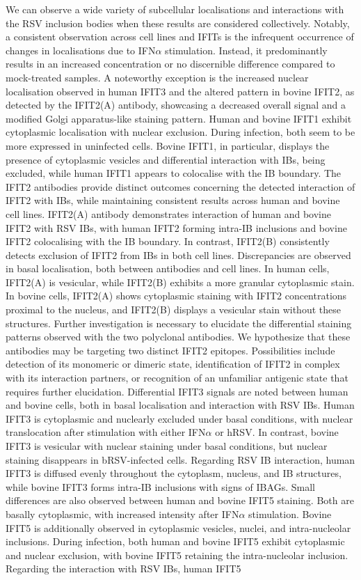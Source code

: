 We can observe a wide variety of subcellular localisations and interactions with the RSV inclusion bodies when these results are considered collectively. Notably, a consistent observation across cell lines and IFITs is the infrequent occurrence of changes in localisations due to IFN\(\alpha\) stimulation. Instead, it predominantly results in an increased concentration or no discernible difference compared to mock-treated samples. A noteworthy exception is the increased nuclear localisation observed in human IFIT3 and the altered pattern in bovine IFIT2, as detected by the IFIT2(A) antibody, showcasing a decreased overall signal and a modified Golgi apparatus-like staining pattern. Human and bovine IFIT1 exhibit cytoplasmic localisation with nuclear exclusion. During infection, both seem to be more expressed in uninfected cells. Bovine IFIT1, in particular, displays the presence of cytoplasmic vesicles and differential interaction with IBs, being excluded, while human IFIT1 appears to colocalise with the IB boundary. The IFIT2 antibodies provide distinct outcomes concerning the detected interaction of IFIT2 with IBs, while maintaining consistent results across human and bovine cell lines. IFIT2(A) antibody demonstrates interaction of human and bovine IFIT2 with RSV IBs, with human IFIT2 forming intra-IB inclusions and bovine IFIT2 colocalising with the IB boundary. In contrast, IFIT2(B) consistently detects exclusion of IFIT2 from IBs in both cell lines. Discrepancies are observed in basal localisation, both between antibodies and cell lines. In human cells, IFIT2(A) is vesicular, while IFIT2(B) exhibits a more granular cytoplasmic stain. In bovine cells, IFIT2(A) shows cytoplasmic staining with IFIT2 concentrations proximal to the nucleus, and IFIT2(B) displays a vesicular stain without these structures. Further investigation is necessary to elucidate the differential staining patterns observed with the two polyclonal antibodies. We hypothesize that these antibodies may be targeting two distinct IFIT2 epitopes. Possibilities include detection of its monomeric or dimeric state, identification of IFIT2 in complex with its interaction partners, or recognition of an unfamiliar antigenic state that requires further elucidation. Differential IFIT3 signals are noted between human and bovine cells, both in basal localisation and interaction with RSV IBs. Human IFIT3 is cytoplasmic and nuclearly excluded under basal conditions, with nuclear translocation after stimulation with either IFN\(\alpha\) or hRSV. In contrast, bovine IFIT3 is vesicular with nuclear staining under basal conditions, but nuclear staining disappears in bRSV-infected cells. Regarding RSV IB interaction, human IFIT3 is diffused evenly throughout the cytoplasm, nucleus, and IB structures, while bovine IFIT3 forms intra-IB inclusions with signs of IBAGs. Small differences are also observed between human and bovine IFIT5 staining. Both are basally cytoplasmic, with increased intensity after IFN\(\alpha\) stimulation. Bovine IFIT5 is additionally observed in cytoplasmic vesicles, nuclei, and intra-nucleolar inclusions. During infection, both human and bovine IFIT5 exhibit cytoplasmic and nuclear exclusion, with bovine IFIT5 retaining the intra-nucleolar inclusion. Regarding the interaction with RSV IBs, human IFIT5 